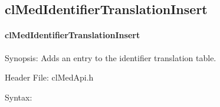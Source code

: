 \begin{flushleft}
\subsection{clMedIdentifierTranslationInsert}
\hypertarget{pagemed104}{}\paragraph{cl\-Med\-Identifier\-Translation\-Insert}\label{pagemed104}
\begin{Desc}
\item[Synopsis:]Adds an entry to the identifier translation table.\end{Desc}
\begin{Desc}
\item[Header File:]clMedApi.h\end{Desc}
\begin{Desc}
\item[Syntax:]


\end{Desc}
\end{flushleft}
